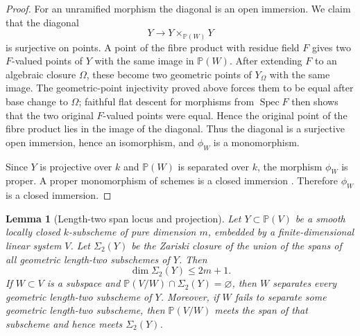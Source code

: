 \documentclass{lms}
\newtheorem{lemma}[theorem]{Lemma}
\DeclareMathOperator{\Spec}{Spec}
\newcommand{\PP}{\mathbb P}
\begin{document}
\begin{proof}
For an unramified morphism the diagonal is an open immersion.  We claim that the diagonal
\[
        Y\longrightarrow Y\times_{\PP(W)}Y
\]
is surjective on points.  A point of the fibre product with residue field $F$ gives two $F$-valued points of $Y$ with the same image in $\PP(W)$.  After extending $F$ to an algebraic closure $\Omega$, these become two geometric points of $Y_\Omega$ with the same image.  The geometric-point injectivity proved above forces them to be equal after base change to $\Omega$; faithful flat descent for morphisms from $\Spec F$ then shows that the two original $F$-valued points were equal.  Hence the original point of the fibre product lies in the image of the diagonal.  Thus the diagonal is a surjective open immersion, hence an isomorphism, and $\phi_W$ is a monomorphism.

Since $Y$ is projective over $k$ and $\PP(W)$ is separated over $k$, the morphism $\phi_W$ is proper.  A proper monomorphism of schemes is a closed immersion \cite[Tag 04XV]{StacksProject}.  Therefore $\phi_W$ is a closed immersion.
\end{proof}

\begin{lemma}[Length-two span locus and projection]\label{lem:length-two-projection}
Let $Y\subset\PP(V)$ be a smooth locally closed $k$-subscheme of pure dimension $m$, embedded by a finite-dimensional linear system $V$.  Let $\Sigma_2(Y)$ be the Zariski closure of the union of the spans of all geometric length-two subschemes of $Y$.  Then
\[
        \dim \Sigma_2(Y)\le 2m+1.
\]
If $W\subset V$ is a subspace and $\PP(V/W)\cap\Sigma_2(Y)=\varnothing$, then $W$ separates every geometric length-two subscheme of $Y$.  Moreover, if $W$ fails to separate some geometric length-two subscheme, then $\PP(V/W)$ meets the span of that subscheme and hence meets $\Sigma_2(Y)$.
\end{lemma}
\end{document}
